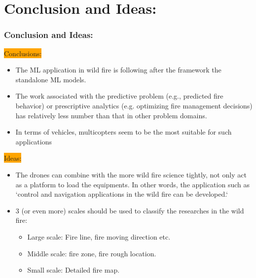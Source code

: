 \section{Conclusion and Ideas:}
\begin{frame}
    \frametitle{Conclusion and Ideas:}

    \colorbox{orange}{Conclusions:}
    \begin{itemize}
        \item The ML application in wild fire is following after the framework
            the standalone ML models.
        \item The work associated with the predictive problem (e.g., predicted 
            fire behavior) or prescriptive analytics (e.g. optimizing fire
            management decisions) has relatively less number than that in other
            problem domains.
        \item In terms of vehicles, multicopters seem to be the most suitable
            for such applications
    \end{itemize}
    \colorbox{orange}{Ideas:}
    \begin{itemize}
        \item The drones can combine with the more wild fire science
            tightly, not only act as a platform to load the equipments. In other
            words, the application such as `control and navigation applications
            in the wild fire can be developed.`
        \item 3 (or even more) scales should be used to classify the researches
            in the wild fire:
            \begin{itemize}
                \item Large scale: Fire line, fire moving direction etc.
                \item Middle scale: fire zone, fire rough location.
                \item Small scale: Detailed fire map.
            \end{itemize}
    \end{itemize}

\end{frame}

